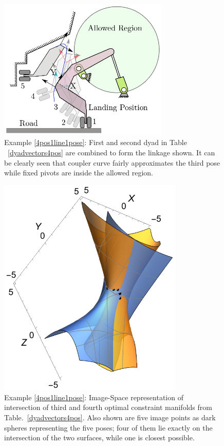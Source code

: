 \documentclass[twocolumn,10pt]{asme2ej}
\begin{document}
\begin{figure}
\centering
\includegraphics[width=230pt]{figure/fig3.eps}
\caption{Example \ref{4pos1line1pose}: First and second dyad in Table ~\ref{dyadvectors4pos} are combined to form the linkage shown. It can be clearly seen that coupler curve fairly approximates the third pose while fixed pivots are inside the allowed region.}
\label{4posRRRP}
\end{figure}

\begin{figure}
\centering
\includegraphics[width=250pt]{figure/fig4.eps}
\caption{Example \ref{4pos1line1pose}: Image-Space representation of intersection of third and fourth optimal constraint manifolds from Table.~\ref{dyadvectors4pos}. Also shown are five image points as dark spheres representing the five poses; four of them lie exactly on the intersection of the two surfaces, while one is closest possible.}
\label{4posmanifolds}
\end{figure}
\end{document}
